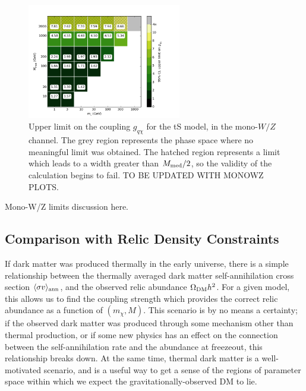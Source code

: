 \begin{figure}[!h]
  \centering
    \includegraphics[width=0.6\textwidth]{figures/grid_allpoints_TSD_rat1.png}
    \caption{Upper limit on the coupling $g_{q \chi}$ for the tS model, in the mono-$W/Z$ channel. The grey region represents the phase space where no meaningful limit was obtained. The hatched region represents a limit which leads to a width greater than $M_{\mathrm{med}} / 2$, so the validity of the calculation begins to fail. TO BE UPDATED WITH MONOWZ PLOTS.}
    \label{fig:MonoWZ_TSD_couplinglimit}
\end{figure}

Mono-W/Z limits discussion here.

\subsection{Comparison with Relic Density Constraints}


If dark matter was produced thermally in the early universe, there is a simple relationship between the thermally averaged dark matter self-annihilation cross section $\langle\sigma v\rangle_{\rm ann}$, and the observed relic abundance $\Omega_{\rm DM}h^2$. For a given model, this allows us to find the coupling strength which provides the correct relic abundance as a function of $(m_\chi, M)$.
%
This scenario is by no means a certainty; if the observed dark matter was produced through some mechanism other than thermal production, or if some new physics has an effect on the connection between the self-annihilation rate and the abundance at freezeout, this relationship breaks down. At the same time, thermal dark matter is a well-motivated scenario, and is a useful way to get a sense of the regions of parameter space within which we expect the gravitationally-observed DM to lie.

